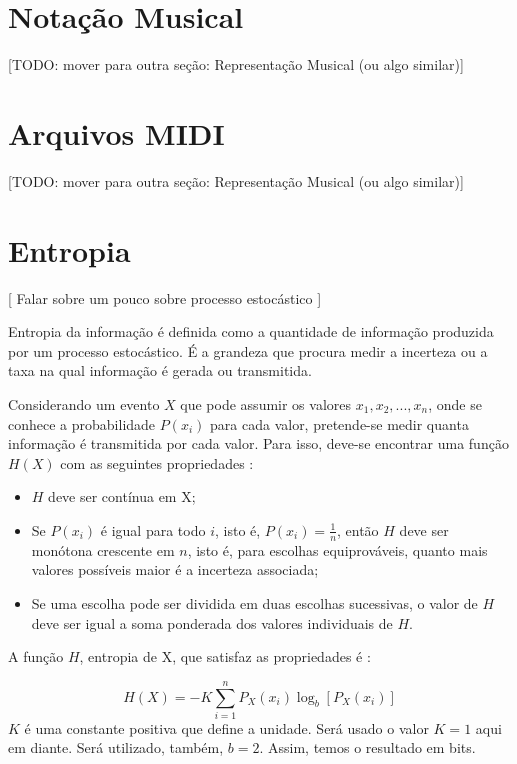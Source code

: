 \section{Notação Musical}

[TODO: mover para outra seção: Representação Musical (ou algo similar)]

\section{Arquivos MIDI}

[TODO: mover para outra seção: Representação Musical (ou algo similar)]



\section{Entropia}

[ Falar sobre um pouco sobre processo estocástico ]

Entropia da informação é definida como a quantidade de informação produzida por um processo estocástico. É a grandeza que procura medir a incerteza ou a taxa na qual informação é gerada ou transmitida.

Considerando um evento $X$ que pode assumir os valores ${x_1, x_2, ..., x_n}$, onde se conhece a probabilidade $P(x_i)$ para cada valor, pretende-se medir quanta informação é transmitida por cada valor. Para isso, deve-se encontrar uma função $H(X)$ com as seguintes propriedades \cite{shannon}:

\begin{itemize}
    \item $H$ deve ser contínua em X;
    \item Se $P(x_i)$ é igual para todo $i$, isto é, $P(x_i) = \frac{1}{n}$, então $H$ deve ser monótona crescente em $n$, isto é, para escolhas equiprováveis, quanto mais valores possíveis maior é a incerteza associada;
    \item Se uma escolha pode ser dividida em duas escolhas sucessivas, o valor de $H$ deve ser igual a soma ponderada dos valores individuais de $H$. 
\end{itemize}

A função $H$, entropia de X, que satisfaz as propriedades é \cite{shannon}:

\begin{equation}
    H(X) = - K \sum_{i=1}^{n} P_X(x_i) \log_b{[P_X(x_i)]}
\end{equation}
$K$ é uma constante positiva que define a unidade. Será usado o valor $K=1$ aqui em diante. Será utilizado, também, $b=2$. Assim, temos o resultado em bits.

